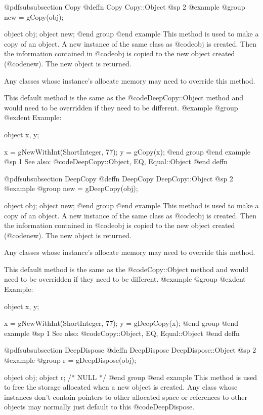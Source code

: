 @pdfsubsubsection {Copy}
@deffn {Copy} Copy::Object
@sp 2
@example
@group
new = gCopy(obj);

object  obj;
object  new;
@end group
@end example
This method is used to make a copy of an object.  A new instance
of the same class as @code{obj} is created.  Then the information
contained in @code{obj} is copied to the new object created (@code{new}).
The new object is returned.

Any classes whose instance's allocate memory may need to override this method.

This default method is the same as the @code{DeepCopy::Object} method and
would need to be overridden if they need to be different.
@example
@group
@exdent Example:

object  x, y;

x = gNewWithInt(ShortInteger, 77);
y = gCopy(x);
@end group
@end example
@sp 1
See also:  @code{DeepCopy::Object, EQ, Equal::Object}
@end deffn












@pdfsubsubsection {DeepCopy}
@deffn {DeepCopy} DeepCopy::Object
@sp 2
@example
@group
new = gDeepCopy(obj);

object  obj;
object  new;
@end group
@end example
This method is used to make a copy of an object.  A new instance
of the same class as @code{obj} is created.  Then the information
contained in @code{obj} is copied to the new object created (@code{new}).
The new object is returned.

Any classes whose instance's allocate memory may need to override this method.

This default method is the same as the @code{Copy::Object} method and
would need to be overridden if they need to be different.
@example
@group
@exdent Example:

object  x, y;

x = gNewWithInt(ShortInteger, 77);
y = gDeepCopy(x);
@end group
@end example
@sp 1
See also:  @code{Copy::Object, EQ, Equal::Object}
@end deffn









@pdfsubsubsection {DeepDispose}
@deffn {DeepDispose} DeepDispose::Object
@sp 2
@example
@group
r = gDeepDispose(obj);

object  obj;
object  r;     /*  NULL  */
@end group
@end example
This method is used to free the storage allocated when a new object is
created.  Any class whose instances don't contain pointers to other
allocated space or references to other objects may normally just default
to this @code{DeepDispose}.

